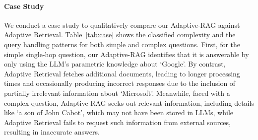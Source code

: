 \paragraph{Case Study}
We conduct a case study to qualitatively compare our Adaptive-RAG against Adaptive Retrieval. Table~\ref{tab:case} shows the classified complexity and the query handling patterns for both simple and complex questions. 
First, for the simple single-hop question, our Adaptive-RAG identifies that it is answerable by only using the LLM's parametric knowledge about `Google'. By contrast, Adaptive Retrieval fetches additional documents, leading to longer processing times and occasionally producing incorrect responses due to the inclusion of partially irrelevant information about `Microsoft'.
Meanwhile, faced with a complex question, Adaptive-RAG seeks out relevant information, including details like `a son of John Cabot', which may not have been stored in LLMs, while Adaptive Retrieval fails to request such information from external sources, resulting in inaccurate answers.

